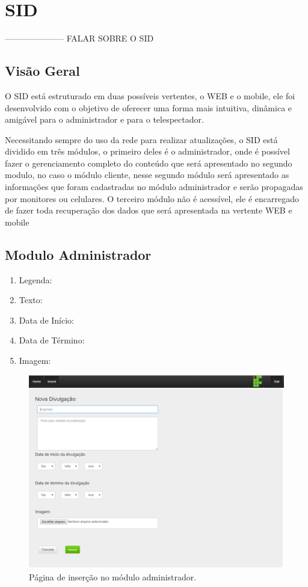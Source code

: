 \chapter[SID]{SID}
--------------------- FALAR SOBRE O SID

\section{Visão Geral}
O SID está estruturado em duas possíveis vertentes, o WEB e o mobile, ele foi
desenvolvido com o objetivo de oferecer uma forma mais intuitiva, dinâmica e amigável
para o administrador e para o telespectador.

Necessitando sempre do uso da rede para realizar atualizações, o SID está dividido
em três módulos, o primeiro deles é o administrador, onde é possível fazer o gerenciamento
completo do conteúdo que será apresentado no segundo modulo, no caso o módulo cliente,
nesse segundo módulo será apresentado as informações que foram cadastradas no módulo
administrador e serão propagadas por monitores ou celulares. O terceiro módulo não é
acessível, ele é encarregado de fazer toda recuperação dos dados que será apresentada na
vertente WEB e mobile

\section{Modulo Administrador}
 \begin{enumerate}
   \item Legenda: 
   \item Texto: 
   \item Data de Início:
   \item Data de Término:
   \item Imagem:
 \end{enumerate}
 
 \begin{figure}[!htb]
\centering
\includegraphics[scale=0.6]{figuras/administrador1}
\caption{Página de inserção no módulo administrador.}
\label{Rotulo}
\end{figure}

